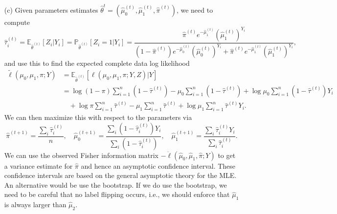 \begin{enumerate}
\item[(c)] Given parameters estimates $\hat \theta^t = (\hat \mu_0^{(t)}, \hat \mu_1^{(t)}, \hat \pi^{(t)})$, we need to compute
		\begin{equation*}
		\hat \tau_i^{(t)} = \mathbb E_{\hat \theta^{(t)}}[Z_i|Y_i] = \mathbb P_{\hat \theta^{(t)}}[Z_i = 1|Y_i] = \frac{\hat \pi^{(t)}e^{-\hat \mu_1^{(t)}}(\hat \mu_1^{(t)})^{Y_i}}{(1-\hat \pi^{(t)})e^{-\hat \mu_0^{(t)}}(\hat \mu_0^{(t)})^{Y_i} + \hat \pi^{(t)}e^{-\hat \mu_1^{(t)}}(\hat \mu_1^{(t)})^{Y_i}},
		\end{equation*}
		and use this to find the expected complete data log likelihood
		\begin{equation*}
		\begin{split}
		\tilde \ell(\mu_0, \mu_1, \pi; Y) &= \mathbb E_{\hat \theta^{(t)}}[\ell(\mu_0, \mu_1, \pi; Y, Z)|Y] \\
		&= \log(1-\pi)\sum_{i = 1}^n (1-\hat \tau^{(t)}) - \mu_0 \sum_{i = 1}^n (1-\hat \tau^{(t)}) + \log \mu_0 \sum_{i = 1}^n (1-\hat \tau^{(t)})Y_i \\
		&\quad + \log \pi \sum_{i = 1}^n \hat \tau^{(t)} - \mu_1 \sum_{i = 1}^n \hat \tau^{(t)} + \log \mu_1 \sum_{i = 1}^n \hat \tau^{(t)} Y_i.
		\end{split}
		\end{equation*}
		We can then maximize this with respect to the parameters via
		\begin{equation*}
		\hat \pi^{(t+1)} = \frac{\sum_i \hat \tau_i^{(t)}}{n},  \quad \hat \mu_0^{(t+1)} = \frac{\sum_i (1-\hat \tau_i^{(t)}) Y_i}{\sum_i (1 - \hat \tau_i^{(t)})}, \quad \hat \mu_1^{(t+1)} = \frac{\sum_i \hat \tau_i^{(t)} Y_i}{\sum_i \hat \tau_i^{(t)}}.
		\end{equation*}
		We can use the observed Fisher information matrix $-\ddot \ell(\hat \mu_0, \hat\mu_1, \hat \pi; Y)$ to get a variance estimate for $\hat \pi$ and hence an asymptotic confidence interval. These confidence intervals are based on the general asymptotic theory for the MLE. An alternative would be use the bootstrap. If we do use the bootstrap, we need to be careful that no label flipping occurs, i.e., we should enforce that $\hat{\mu}_1$ is always larger than $\hat{\mu}_2$.\\


\end{enumerate}
